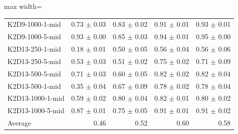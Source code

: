 \documentclass{article}
\begin{document}
\begin{table}[ht]
\begin{center}
\begin{small}
\begin{adjustbox}{max width=\columnwidth}
\begin{tabular}{l|rrrr}
K2D9-1000-1-mid & 0.73 $\pm$ 0.03 & 0.83 $\pm$ 0.02 & 0.91 $\pm$ 0.01 & 0.93 $\pm$ 0.01\\
K2D9-1000-5-mid & 0.93 $\pm$ 0.00 & 0.85 $\pm$ 0.03 & 0.94 $\pm$ 0.01 & 0.95 $\pm$ 0.00\\
K2D13-250-1-mid & 0.18 $\pm$ 0.01 & 0.50 $\pm$ 0.05 & 0.56 $\pm$ 0.04 & 0.56 $\pm$ 0.06\\
K2D13-250-5-mid & 0.53 $\pm$ 0.03 & 0.51 $\pm$ 0.02 & 0.75 $\pm$ 0.02 & 0.71 $\pm$ 0.09\\
K2D13-500-5-mid & 0.71 $\pm$ 0.03 & 0.60 $\pm$ 0.05 & 0.82 $\pm$ 0.02 & 0.82 $\pm$ 0.04\\
K2D13-500-1-mid & 0.35 $\pm$ 0.04 & 0.67 $\pm$ 0.09 & 0.78 $\pm$ 0.02 & 0.78 $\pm$ 0.04\\
K2D13-1000-1-mid & 0.59 $\pm$ 0.02 & 0.80 $\pm$ 0.04 & 0.82 $\pm$ 0.01 & 0.80 $\pm$ 0.02\\
K2D13-1000-5-mid & 0.87 $\pm$ 0.01 & 0.75 $\pm$ 0.05 & 0.91 $\pm$ 0.01 & 0.91 $\pm$ 0.02\\
\midrule
Average & 0.46 & 0.52 & 0.60 & 0.58\\
\end{tabular}
        \end{adjustbox}
    \end{small}
    \end{center}
    \vskip -0.1in
\end{table}
\end{document}
